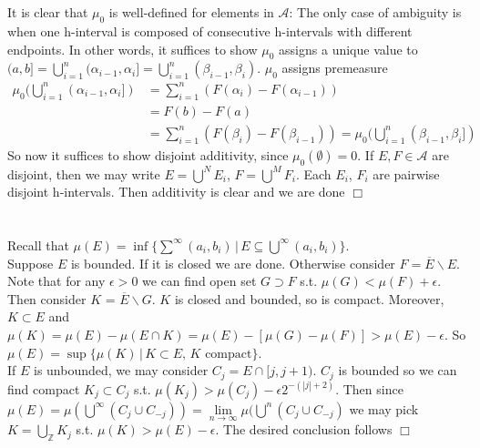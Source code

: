 \documentclass{article}
\begin{document}
\section{}
It is clear that $\mu_0$ is well-defined for elements in $\mathcal{A}$: The only case of ambiguity is when one h-interval is composed of consecutive h-intervals with different endpoints. In other words, it suffices to show $\mu_0$ assigns a unique value to $(a,b] = \bigcup\limits_{i=1}^n (\alpha_{i-1},\alpha_i] = \bigcup\limits_{i=1}^n (\beta_{i-1},\beta_i)$. $\mu_0$ assigns premeasure
\begin{equation*}
    \begin{split}
    \mu_0(\bigcup\limits_{i=1}^n (\alpha_{i-1},\alpha_i]) &= \sum\limits_{i=1}^n \left(F(\alpha_i) - F(\alpha_{i-1})\right)\\
    &= F(b) - F(a)\\
    &= \sum\limits_{i=1}^n \left(F(\beta_i) - F(\beta_{i-1})\right) = \mu_0(\bigcup\limits_{i=1}^n (\beta_{i-1},\beta_i])
    \end{split}
\end{equation*}
So now it suffices to show disjoint additivity, since $\mu_0(\emptyset) = 0$. If $E,F \in \mathcal{A}$ are disjoint, then we may write $E = \bigcup\limits^N E_i$, $F = \bigcup\limits^M F_i$. Each $E_i$, $F_i$ are pairwise disjoint h-intervals. Then additivity is clear and we are done $\Box$

\section{}
Recall that $\mu(E) = \inf\{\sum\limits^\infty (a_i,b_i) \,|\, E \subseteq \bigcup\limits^\infty (a_i,b_i) \}$.\\
Suppose $E$ is bounded. If it is closed we are done. Otherwise consider $F = \overline{E}\backslash E$. Note that for any $\epsilon > 0$ we can find open set $G \supset F$ s.t. $\mu(G) < \mu(F) + \epsilon$. Then consider $K$ = $\overline{E} \backslash G$. $K$ is closed and bounded, so is compact. Moreover, $K \subset E$ and $\mu(K) = \mu(E) - \mu(E\cap K) = \mu(E) - [\mu(G) - \mu(F)] > \mu(E) - \epsilon$. So $\mu(E) = \sup \{\mu(K) \,|\, K \subset E,\, K \textrm{ compact}\}$.\\
If $E$ is unbounded, we may consider $C_j = E\cap [j,j+1)$. $C_j$ is bounded so we can find compact $K_j \subset C_j$ s.t. $\mu(K_j) > \mu(C_j) - \epsilon 2^{-(|j|+2)}$. Then since $\mu(E) = \mu\left(\bigcup\limits^\infty (C_j \cup C_{-j})\right) = \lim\limits_{n\rightarrow\infty} \mu(\bigcup\limits^{n} (C_j \cup C_{-j})$ we may pick $K = \bigcup\limits_{\mathbb{Z}} K_j$ s.t. $\mu(K) > \mu(E) - \epsilon$. The desired conclusion follows $\Box$
\end{document}
